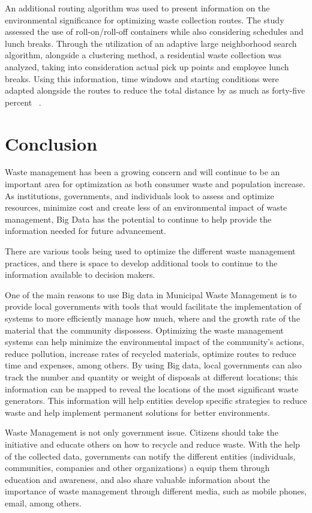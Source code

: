 \documentclass[sigconf]{acmart}
\begin{document}
An additional routing algorithm was used to present information on the environmental significance for optimizing waste collection routes.  The study assessed the use of roll-on/roll-off containers while also considering schedules and lunch breaks.  Through the utilization of an adaptive large neighborhood search algorithm, alongside a clustering method, a residential waste collection was analyzed, taking into consideration actual pick up points and employee lunch breaks.  Using this information, time windows and starting conditions were adapted alongside the routes to reduce the total distance by as much as forty-five percent ~\cite{shahrokni2014big}.

\section{Conclusion}
Waste management has been a growing concern and will continue to be an important area for optimization as both consumer waste and population increase.  As institutions, governments, and individuals look to assess and optimize resources, minimize cost and create less of an environmental impact of waste management, Big Data has the potential to continue to help provide the information needed for future advancement.

There are various tools being used to optimize the different waste management practices, and there is space to develop additional tools to continue to the information available to decision makers.

One of the main reasons to use Big data in Municipal Waste Management is to provide local governments with tools that would facilitate the implementation of systems to more efficiently manage how much, where and the growth rate of the material that the community dispossess. Optimizing the waste management systems can help minimize the environmental impact of the community's actions, reduce pollution, increase rates of recycled materials, optimize routes to reduce time and expenses, among others.
By using Big data, local governments can also track the number and quantity or weight of disposals at different locations; this information can be mapped to reveal the locations of the most significant waste generators.  This information will help entities develop specific strategies to reduce waste and help implement permanent solutions for better environments. 

Waste Management is not only government issue. Citizens should take the initiative and educate others on how to recycle and reduce waste. With the help of the collected data, governments can notify the different entities (individuals, communities, companies and other organizations) a equip them through education and awareness, and also share valuable information about the importance of waste management through different media, such as mobile phones, email, among others.
\end{document}
